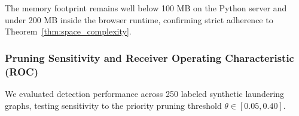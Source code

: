 \begin{table}[h]
\centering
\caption{System Memory Footprint across Active Graph Sizes.}
\label{tab:memory_table}
\end{table}

The memory footprint remains well below 100 MB on the Python server and under 200 MB inside the browser runtime, confirming strict adherence to Theorem~\ref{thm:space_complexity}.

\subsubsection{Pruning Sensitivity and Receiver Operating Characteristic (ROC)}
We evaluated detection performance across 250 labeled synthetic laundering graphs, testing sensitivity to the priority pruning threshold $\theta \in [0.05, 0.40]$.

\begin{table}[h]
\centering
\caption{Detection Accuracy and False Positive Rates as a Function of Pruning Threshold $\theta$.}
\label{tab:pruning_sensitivity}
\end{table}

